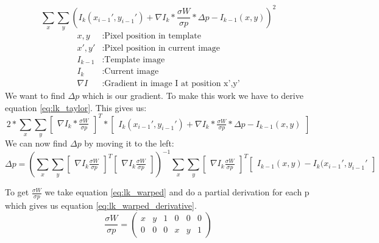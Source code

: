\documentclass[11pt,a4paper,titlepage,oneside]{report}
\begin{document}
\begin{equation}\label{eq:lk_taylor}
  \sum_x\sum_y(I_{k}(x_{i-1}',y_{i-1}')+\nabla I_{k}*\frac{\sigma W}{\sigma p}*\Delta p-I_{k-1}(x,y))^2
\end{equation}
\begin{align*}
  x,y        &:  \text{Pixel position in template}\\
  x',y'      &:  \text{Pixel position in current image}\\
  I_{k-1}    &:  \text{Template image}\\
  I_{k}      &:  \text{Current image}\\
  \nabla I  &:  \text{Gradient in image I at position x',y'}
\end{align*}
We want to find $\Delta p$ which is our gradient. To make this work we have to derive equation \ref{eq:lk_taylor}. This gives us:
\begin{equation}
  2*\sum_x\sum_y\begin{bmatrix}\nabla I_{k}*\frac{\sigma W}{\sigma p}\end{bmatrix}^T*\begin{bmatrix}I_{k}(x_{i-1}',y_{i-1}')+\nabla I_{k}*\frac{\sigma W}{\sigma p}*\Delta p-I_{k-1}(x,y)\end{bmatrix}
\end{equation}
We can now find $\Delta p$ by moving it to the left:
\tiny
\begin{equation}\label{eq:lk_dp}
  \Delta p=(\sum_x\sum_y\begin{bmatrix}\nabla I_{k}\frac{\sigma W}{\sigma p}\end{bmatrix}^T\begin{bmatrix}\nabla I_{k}\frac{\sigma W}{\sigma p}\end{bmatrix})^{-1}
  \sum_x\sum_y\begin{bmatrix}\nabla I_{k}\frac{\sigma W}{\sigma p}\end{bmatrix}^T\begin{bmatrix}I_{k-1}(x,y) - I_{k}(x_{i-1}',y_{i-1}'\end{bmatrix}
\end{equation}
\normalsize

To  get $\frac{\sigma W}{\sigma p}$ we take equation \ref{eq:lk_warped} and do a partial derivation for each p which gives us equation \ref{eq:lk_warped_derivative}.
\begin{equation}\label{eq:lk_warped_derivative}
  \frac{\sigma W}{\sigma p}=
  \begin{pmatrix}
    x & y & 1 & 0 & 0 & 0 \\
    0 & 0 & 0 & x & y & 1
  \end{pmatrix}
\end{equation}
\end{document}
